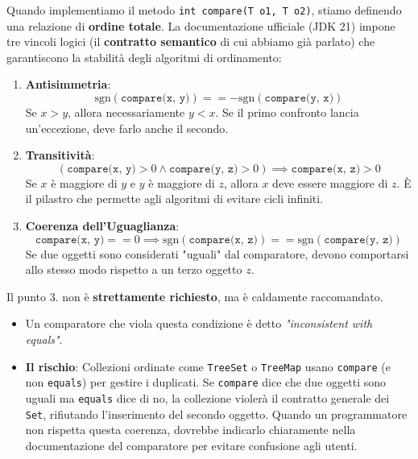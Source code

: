 Quando implementiamo il metodo \texttt{int compare(T o1, T o2)}, stiamo definendo una relazione di \textbf{ordine totale}. La documentazione ufficiale (JDK 21) impone tre vincoli logici (il \textbf{contratto semantico} di cui abbiamo già parlato) che garantiscono la stabilità degli algoritmi di ordinamento:
\vspace{\baselineskip}
\begin{enumerate}
    \item \textbf{Antisimmetria}: 
    \[ \text{sgn}(\texttt{compare(x, y)}) == -\text{sgn}(\texttt{compare(y, x)}) \]
    Se $x > y$, allora necessariamente $y < x$. Se il primo confronto lancia un'eccezione, deve farlo anche il secondo.
    
    \item \textbf{Transitività}: 
    \[ (\texttt{compare(x, y)} > 0 \land \texttt{compare(y, z)} > 0) \implies \texttt{compare(x, z)} > 0 \]
    Se $x$ è maggiore di $y$ e $y$ è maggiore di $z$, allora $x$ deve essere maggiore di $z$. È il pilastro che permette agli algoritmi di evitare cicli infiniti.
    
    \item \textbf{Coerenza dell'Uguaglianza}: 
    \[ \texttt{compare(x, y)} == 0 \implies \text{sgn}(\texttt{compare(x, z)}) == \text{sgn}(\texttt{compare(y, z)}) \]
    Se due oggetti sono considerati "uguali" dal comparatore, devono comportarsi allo stesso modo rispetto a un terzo oggetto $z$.
\end{enumerate}

\begin{observation}
    Il punto 3. non è \textbf{strettamente richiesto}, ma è caldamente raccomandato. 
\begin{itemize}
    \item Un comparatore che viola questa condizione è detto \textit{"inconsistent with equals"}.
    \item \textbf{Il rischio}: Collezioni ordinate come \texttt{TreeSet} o \texttt{TreeMap} usano \texttt{compare} (e non \texttt{equals}) per gestire i duplicati. Se \texttt{compare} dice che due oggetti sono uguali ma \texttt{equals} dice di no, la collezione violerà il contratto generale dei \texttt{Set}, rifiutando l'inserimento del secondo oggetto. Quando un programmatore non rispetta questa coerenza, dovrebbe indicarlo chiaramente nella documentazione del comparatore per evitare confusione agli utenti.
\end{itemize}
\end{observation}


